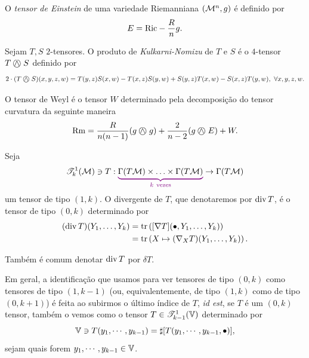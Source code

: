 \begin{deff}
  O \textit{tensor de Einstein} de uma variedade Riemanniana $\left(\mathcal{M}^n, g \right)$ é definido por
  $$E= \mathrm{Ric} - \frac{R}{n} g.$$
  \end{deff}

\begin{deff}\label{DefKulNomizu}
  Sejam $T, S$ $2$-tensores. O produto de \textit{Kulkarni-Nomizu} de $T$ e $S$ é o $4$-tensor $T \mathbin{\bigcirc\mspace{-15mu}\wedge\mspace{4mu}} S$ definido por
  $$2 \cdot (T \mathbin{\bigcirc\mspace{-15mu}\wedge\mspace{4mu}} S)(x, y, z, w) = T(y, z) S(x, w) - T(x, z) S(y, w)  + S(y, z) T(x, w) - S(x, z) T(y, w), \ \forall x,y, z, w.$$
  \end{deff}

  \begin{deff}
  O tensor de Weyl é o tensor $W$ determinado pela decomposição do tensor curvatura da seguinte maneira
  $$\mathrm{Rm} = \frac{R}{n(n-1)} (g \mathbin{\bigcirc\mspace{-15mu}\wedge\mspace{4mu}} g) + \frac{2}{n-2} (g \mathbin{\bigcirc\mspace{-15mu}\wedge\mspace{4mu}} E) + W.$$ 
  \end{deff}

  \begin{deff}\label{divergenteDeT}
    Seja 
    \[
    \T^{1}_{k}(\mm) \ni T: \Munderbrace{\Gamma(T\mm) \times \ldots \times \Gamma(T \mm)}{k \ \text{vezes}} \to \Gamma(T \mm)
    \]
    um tensor de tipo $(1, k)$. O divergente de $T$, que denotaremos por $\operatorname{div} T$, é o tensor de tipo $(0, k)$ determinado por
    \[\begin{aligned}
    (\operatorname{div} T)(Y_1, \ldots, Y_k) &= \operatorname{tr}\left( [\nabla T](\bullet, Y_1, \ldots, Y_k) \right) \\ 
    &= \operatorname{tr}\left(X \mapsto (\nabla_X T)(Y_1, \ldots, Y_k) \right).
    \end{aligned} 
    \]
    \end{deff}

    \begin{oobs}\label{DeltaT}
      Também é comum denotar $\operatorname{div} T$ por $\delta T$.
      \end{oobs}

      \begin{oobs}\label{IdentUmK}
        Em geral, a identificação que usamos para ver tensores de tipo $(0, k)$ como tensores de tipo $(1, k-1)$ (ou, equivalentemente, de tipo $(1, k)$ como de tipo $(0,k+1)$) é feita ao subirmos o último índice de $T$, \emph{id est}, se $T$ é um $(0, k)$ tensor, também o vemos como o tensor $T \in \mathscr{T}^{1}_{k-1}(\mathbb{V})$ determinado por 
        \[
        \mathbb{V} \ni T(y_1, \cdots, y_{k-1}) = \sharp[T(y_1, \cdots, y_{k-1}, \bullet)],
        \]
        sejam quais forem $y_1, \cdots, y_{k-1} \in \mathbb{V}$.
        \end{oobs}

